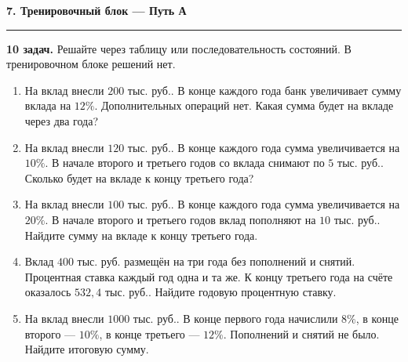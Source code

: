 \documentclass[a4paper,12pt]{article}
\newcommand{\sectiontitle}[1]{%
  \vspace{0.4em}
  {\Large\bfseries\color{darkaccent}#1}\par
  \vspace{0.15em}
  {\color{accent}\rule{\linewidth}{0.6pt}}\par
  \vspace{0.25em}
}
\newcommand{\thrub}{\text{ тыс. руб.}}
\begin{document}
\sectiontitle{7. Тренировочный блок --- Путь А}

\textbf{10 задач.} Решайте через таблицу или последовательность состояний.
В тренировочном блоке решений нет.

\begin{enumerate}
\item На вклад внесли \(200\thrub\). В конце каждого года банк увеличивает сумму вклада на \(12\%\).
Дополнительных операций нет. Какая сумма будет на вкладе через два года?

\item На вклад внесли \(120\thrub\). В конце каждого года сумма увеличивается на \(10\%\).
В начале второго и третьего годов со вклада снимают по \(5\thrub\).
Сколько будет на вкладе к концу третьего года?

\item На вклад внесли \(100\thrub\). В конце каждого года сумма увеличивается на \(20\%\).
В начале второго и третьего годов вклад пополняют на \(10\thrub\).
Найдите сумму на вкладе к концу третьего года.

\item Вклад \(400\thrub\) размещён на три года без пополнений и снятий.
Процентная ставка каждый год одна и та же.
К концу третьего года на счёте оказалось \(532{,}4\thrub\).
Найдите годовую процентную ставку.

\item На вклад внесли \(1000\thrub\).
В конце первого года начислили \(8\%\), в конце второго --- \(10\%\),
в конце третьего --- \(12\%\).
Пополнений и снятий не было.
Найдите итоговую сумму.

\end{enumerate}
\end{document}
